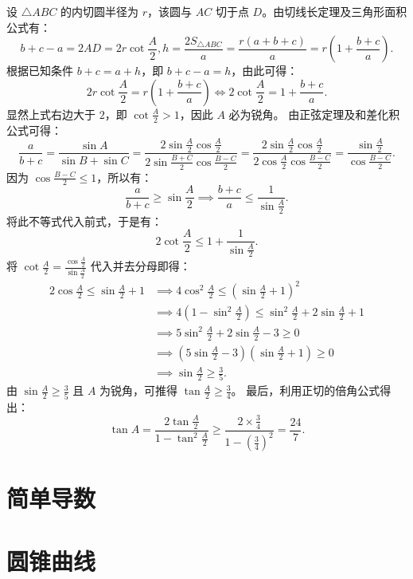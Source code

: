 \documentclass[lang=cn,11pt]{elegantbook}
\begin{document}
\begin{solution}
设 $\triangle ABC$ 的内切圆半径为 $r$，该圆与 $AC$ 切于点 $D$。由切线长定理及三角形面积公式有：
\[b+c-a = 2AD = 2r\cot\frac{A}{2}, h = \frac{2S_{\triangle ABC}}{a} = \frac{r(a+b+c)}{a} = r\left( 1+\frac{b+c}{a} \right).\]
根据已知条件 $b+c=a+h$，即 $b+c-a=h$，由此可得：
\[ 2r\cot\frac{A}{2} = r\left( 1+\frac{b+c}{a} \right) \iff 2\cot\frac{A}{2} = 1+\frac{b+c}{a}. \]
显然上式右边大于 $2$，即 $\cot\frac{A}{2} > 1$，因此 $A$ 必为锐角。
由正弦定理及和差化积公式可得：
\[ \frac{a}{b+c} = \frac{\sin A}{\sin B + \sin C} = \frac{2\sin\frac{A}{2}\cos\frac{A}{2}}{2\sin\frac{B+C}{2}\cos\frac{B-C}{2}} = \frac{2\sin\frac{A}{2}\cos\frac{A}{2}}{2\cos\frac{A}{2}\cos\frac{B-C}{2}} = \frac{\sin\frac{A}{2}}{\cos\frac{B-C}{2}}. \]
因为 $\cos\frac{B-C}{2} \le 1$，所以有：
\[ \frac{a}{b+c} \ge \sin\frac{A}{2} \implies \frac{b+c}{a} \le \frac{1}{\sin\frac{A}{2}}. \]
将此不等式代入前式，于是有：
\[ 2\cot\frac{A}{2} \le 1+\frac{1}{\sin\frac{A}{2}}. \]
将 $\cot\frac{A}{2} = \frac{\cos\frac{A}{2}}{\sin\frac{A}{2}}$ 代入并去分母即得：
\begin{align*}
2\cos\frac{A}{2} \le \sin\frac{A}{2}+1 &\implies 4\cos^2\frac{A}{2} \le (\sin\frac{A}{2}+1)^2 \\
&\implies 4(1-\sin^2\frac{A}{2}) \le \sin^2\frac{A}{2} + 2\sin\frac{A}{2} + 1 \\
&\implies 5\sin^2\frac{A}{2} + 2\sin\frac{A}{2} - 3 \ge 0 \\
&\implies (5\sin\frac{A}{2}-3)(\sin\frac{A}{2}+1) \ge 0 \\
&\implies \sin\frac{A}{2} \ge \frac{3}{5}.
\end{align*}
由 $\sin\frac{A}{2} \ge \frac{3}{5}$ 且 $A$ 为锐角，可推得 $\tan\frac{A}{2} \ge \frac{3}{4}$。
最后，利用正切的倍角公式得出：
\[ \tan A = \frac{2\tan\frac{A}{2}}{1-\tan^2\frac{A}{2}} \ge \frac{2 \times \frac{3}{4}}{1-\left(\frac{3}{4}\right)^2} = \frac{24}{7}. \]
\end{solution}


\chapter{简单导数}








\chapter{圆锥曲线}
\end{document}
